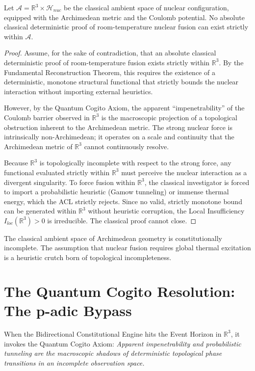 \documentclass[12pt,twoside]{extbook}
\theoremstyle{definition}
\theoremstyle{remark}
\begin{document}
\begin{theorem}
Let $\mathcal{A} = \mathbb{R}^3 \times \mathcal{H}_{nuc}$ be the classical ambient space of nuclear configuration, equipped with the Archimedean metric and the Coulomb potential. No absolute classical deterministic proof of room-temperature nuclear fusion can exist strictly within $\mathcal{A}$.
\end{theorem}

\begin{proof}
Assume, for the sake of contradiction, that an absolute classical deterministic proof of room-temperature fusion exists strictly within $\mathbb{R}^3$. By the Fundamental Reconstruction Theorem, this requires the existence of a deterministic, monotone structural functional that strictly bounds the nuclear interaction without importing external heuristics.

However, by the Quantum Cogito Axiom, the apparent ``impenetrability'' of the Coulomb barrier observed in $\mathbb{R}^3$ is the macroscopic projection of a topological obstruction inherent to the Archimedean metric. The strong nuclear force is intrinsically non-Archimedean; it operates on a scale and continuity that the Archimedean metric of $\mathbb{R}^3$ cannot continuously resolve.

Because $\mathbb{R}^3$ is topologically incomplete with respect to the strong force, any functional evaluated strictly within $\mathbb{R}^3$ must perceive the nuclear interaction as a divergent singularity. To force fusion within $\mathbb{R}^3$, the classical investigator is forced to import a probabilistic heuristic (Gamow tunneling) or immense thermal energy, which the ACL strictly rejects. Since no valid, strictly monotone bound can be generated within $\mathbb{R}^3$ without heuristic corruption, the Local Insufficiency $I_{loc}(\mathbb{R}^3) > 0$ is irreducible. The classical proof cannot close.
\end{proof}

The classical ambient space of Archimedean geometry is constitutionally incomplete. The assumption that nuclear fusion requires global thermal excitation is a heuristic crutch born of topological incompleteness.

\section{The Quantum Cogito Resolution: The p-adic Bypass}
When the Bidirectional Constitutional Engine hits the Event Horizon in $\mathbb{R}^3$, it invokes the Quantum Cogito Axiom: \textit{Apparent impenetrability and probabilistic tunneling are the macroscopic shadows of deterministic topological phase transitions in an incomplete observation space.}
\end{document}
